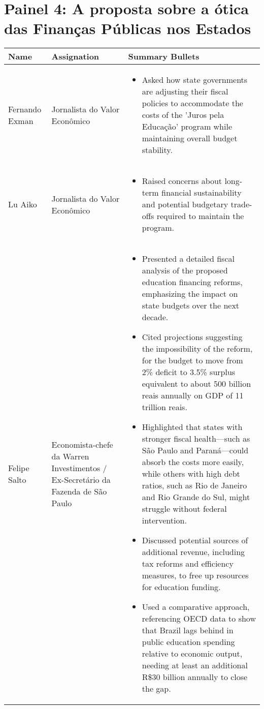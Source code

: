 \documentclass[a4paper,10pt]{article}
\begin{document}
\newpage

\section*{Painel 4: A proposta sobre a ótica das Finanças Públicas nos Estados}

\begin{table}[htbp!]
	\centering
	\renewcommand{\arraystretch}{1.2}
	\begin{tabular}{|p{1.2in}|p{1.6in}|p{4.2in}|}
		\hline
		Name & Assignation & Summary Bullets \\
		\hline
		Fernando Exman & Jornalista do Valor Econômico & 
		\begin{itemize}
			\item Asked how state governments are adjusting their fiscal policies to accommodate the costs of the 'Juros pela Educação' program while maintaining overall budget stability.
		\end{itemize}\\
		\hline
		Lu Aiko & Jornalista do Valor Econômico & \begin{itemize}
			\item Raised concerns about long-term financial sustainability and potential budgetary trade-offs required to maintain the program.
		\end{itemize}\\
		\hline
		Felipe Salto & Economista-chefe da Warren Investimentos / Ex-Secretário da Fazenda de São Paulo & \begin{itemize}
			\item Presented a detailed fiscal analysis of the proposed education financing reforms, emphasizing the impact on state budgets over the next decade.
			\item Cited projections  suggesting the impossibility of the reform, for the budget to move from 2\% deficit to 3.5\% surplus equivalent to about 500 billion reais annually on GDP of 11 trillion reais. 
			\item Highlighted that states with stronger fiscal health—such as São Paulo and Paraná—could absorb the costs more easily, while others with high debt ratios, such as Rio de Janeiro and Rio Grande do Sul, might struggle without federal intervention.
			\item Discussed potential sources of additional revenue, including tax reforms and efficiency measures, to free up resources for education funding.
			\item Used a comparative approach, referencing OECD data to show that Brazil lags behind in public education spending relative to economic output, needing at least an additional R\$30 billion annually to close the gap.

\end{itemize}
\end{tabular}
\end{table}
\end{document}
